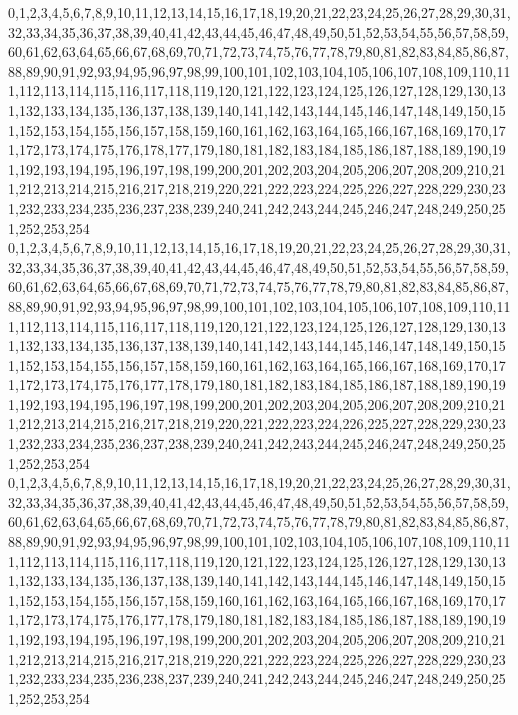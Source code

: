 \documentclass[12pt]{article}
\begin{document}
{0,1,2,3,4,5,6,7,8,9,10,11,12,13,14,15,16,17,18,19,20,21,22,23,24,25,26,27,28,29,30,31,32,33,34,35,36,37,38,39,40,41,42,43,44,45,46,47,48,49,50,51,52,53,54,55,56,57,58,59,60,61,62,63,64,65,66,67,68,69,70,71,72,73,74,75,76,77,78,79,80,81,82,83,84,85,86,87,88,89,90,91,92,93,94,95,96,97,98,99,100,101,102,103,104,105,106,107,108,109,110,111,112,113,114,115,116,117,118,119,120,121,122,123,124,125,126,127,128,129,130,131,132,133,134,135,136,137,138,139,140,141,142,143,144,145,146,147,148,149,150,151,152,153,154,155,156,157,158,159,160,161,162,163,164,165,166,167,168,169,170,171,172,173,174,175,176,178,177,179,180,181,182,183,184,185,186,187,188,189,190,191,192,193,194,195,196,197,198,199,200,201,202,203,204,205,206,207,208,209,210,211,212,213,214,215,216,217,218,219,220,221,222,223,224,225,226,227,228,229,230,231,232,233,234,235,236,237,238,239,240,241,242,243,244,245,246,247,248,249,250,251,252,253,254\\
0,1,2,3,4,5,6,7,8,9,10,11,12,13,14,15,16,17,18,19,20,21,22,23,24,25,26,27,28,29,30,31,32,33,34,35,36,37,38,39,40,41,42,43,44,45,46,47,48,49,50,51,52,53,54,55,56,57,58,59,60,61,62,63,64,65,66,67,68,69,70,71,72,73,74,75,76,77,78,79,80,81,82,83,84,85,86,87,88,89,90,91,92,93,94,95,96,97,98,99,100,101,102,103,104,105,106,107,108,109,110,111,112,113,114,115,116,117,118,119,120,121,122,123,124,125,126,127,128,129,130,131,132,133,134,135,136,137,138,139,140,141,142,143,144,145,146,147,148,149,150,151,152,153,154,155,156,157,158,159,160,161,162,163,164,165,166,167,168,169,170,171,172,173,174,175,176,177,178,179,180,181,182,183,184,185,186,187,188,189,190,191,192,193,194,195,196,197,198,199,200,201,202,203,204,205,206,207,208,209,210,211,212,213,214,215,216,217,218,219,220,221,222,223,224,226,225,227,228,229,230,231,232,233,234,235,236,237,238,239,240,241,242,243,244,245,246,247,248,249,250,251,252,253,254\\
0,1,2,3,4,5,6,7,8,9,10,11,12,13,14,15,16,17,18,19,20,21,22,23,24,25,26,27,28,29,30,31,32,33,34,35,36,37,38,39,40,41,42,43,44,45,46,47,48,49,50,51,52,53,54,55,56,57,58,59,60,61,62,63,64,65,66,67,68,69,70,71,72,73,74,75,76,77,78,79,80,81,82,83,84,85,86,87,88,89,90,91,92,93,94,95,96,97,98,99,100,101,102,103,104,105,106,107,108,109,110,111,112,113,114,115,116,117,118,119,120,121,122,123,124,125,126,127,128,129,130,131,132,133,134,135,136,137,138,139,140,141,142,143,144,145,146,147,148,149,150,151,152,153,154,155,156,157,158,159,160,161,162,163,164,165,166,167,168,169,170,171,172,173,174,175,176,177,178,179,180,181,182,183,184,185,186,187,188,189,190,191,192,193,194,195,196,197,198,199,200,201,202,203,204,205,206,207,208,209,210,211,212,213,214,215,216,217,218,219,220,221,222,223,224,225,226,227,228,229,230,231,232,233,234,235,236,238,237,239,240,241,242,243,244,245,246,247,248,249,250,251,252,253,254\\
}
\end{document}
